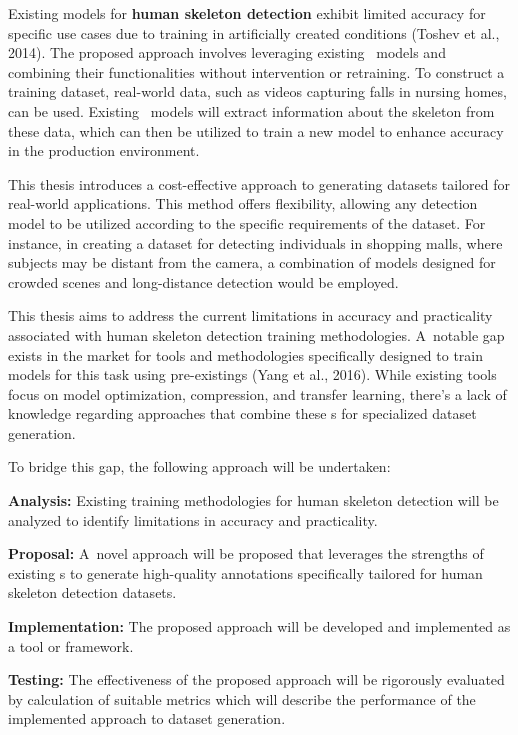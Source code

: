 Existing models for {\bf human skeleton detection} exhibit limited accuracy for specific use cases due to training in artificially created conditions (\scc Toshev et al., 2014). The proposed approach involves leveraging existing \NN\ models and combining their functionalities without intervention or retraining. To construct a training dataset, real-world data, such as videos capturing falls in nursing homes, can be used. Existing \NN\ models will extract information about the skeleton from these data, which can then be utilized to train a new model to enhance accuracy in the production environment.

This thesis introduces a cost-effective approach to generating datasets tailored for real-world applications. This method offers flexibility, allowing any detection model to be utilized according to the specific requirements of the dataset. For instance, in creating a dataset for detecting individuals in shopping malls, where subjects may be distant from the camera, a combination of models designed for crowded scenes and long-distance detection would be employed.

This thesis aims to address the current limitations in accuracy and practicality associated with human skeleton detection training methodologies. A~notable gap exists in the market for tools and methodologies specifically designed to train models for this task using pre-existing\NN\-s (\scc Yang et al., 2016). While existing tools focus on model optimization, compression, and transfer learning, there's a lack of knowledge regarding approaches that combine these \NN\-s for specialized dataset generation.

To bridge this gap, the following approach will be undertaken:

\startitemize[n]
    \item {\bf Analysis:} Existing training methodologies for human skeleton detection will be analyzed to identify limitations in accuracy and practicality.
    \item {\bf Proposal:} A~novel approach will be proposed that leverages the strengths of existing \NN\-s to generate high-quality annotations specifically tailored for human skeleton detection datasets.
    \item {\bf Implementation:} The proposed approach will be developed and implemented as a tool or framework.
    \item {\bf Testing:} The effectiveness of the proposed approach will be rigorously evaluated by calculation of suitable metrics which will describe the performance of the implemented approach to dataset generation.
\stopitemize
